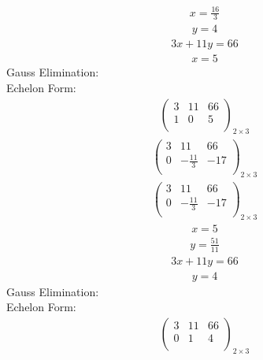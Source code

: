 \documentclass{article}
\begin{document}
\begin{align*}
x=\frac{16}{3}\end{align*}
\begin{align*}
y=4\end{align*}
\begin{align*}
3x + 11y=66\end{align*}
\begin{align*}
x=5\end{align*}
Gauss Elimination:\\
Echelon Form:\\
\begin{align*}
\left(
\begin{array}{cc|c}
3 & 11 & 66\\
1 & 0 & 5\\
\end{array}
\right)_{2\times 3}
\end{align*}
\begin{align*}
\left(
\begin{array}{cc|c}
3 & 11 & 66\\
0 & -\frac{11}{3} & -17\\
\end{array}
\right)_{2\times 3}
\end{align*}
\begin{align*}
\left(
\begin{array}{cc|c}
3 & 11 & 66\\
0 & -\frac{11}{3} & -17\\
\end{array}
\right)_{2\times 3}
\end{align*}
\begin{align*}
x=5\end{align*}
\begin{align*}
y=\frac{51}{11}\end{align*}
\begin{align*}
3x + 11y=66\end{align*}
\begin{align*}
y=4\end{align*}
Gauss Elimination:\\
Echelon Form:\\
\begin{align*}
\left(
\begin{array}{cc|c}
3 & 11 & 66\\
0 & 1 & 4\\
\end{array}
\right)_{2\times 3}
\end{align*}
\end{document}
